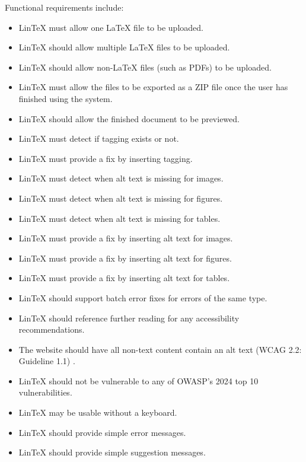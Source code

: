 \documentclass[11pt,titlepage,dvipsnames,table,xcdraw]{article}
\begin{document}
Functional requirements include:
\begin{itemize}
\item LinTeX must allow one LaTeX file to be uploaded.
\item LinTeX should allow multiple LaTeX files to be uploaded.
\item LinTeX should allow non-LaTeX files (such as PDFs) to be uploaded.
\item LinTeX must allow the files to be exported as a ZIP file once the user has finished using the system.
\item LinTeX should allow the finished document to be previewed.
\item LinTeX must detect if tagging exists or not.
\item LinTeX must provide a fix by inserting tagging.
\item LinTeX must detect when alt text is missing for images.
\item LinTeX must detect when alt text is missing for figures.
\item LinTeX must detect when alt text is missing for tables.
\item LinTeX must provide a fix by inserting alt text for images.
\item LinTeX must provide a fix by inserting alt text for figures.
\item LinTeX must provide a fix by inserting alt text for tables.
\item LinTeX should support batch error fixes for errors of the same type.
\item LinTeX should reference further reading for any accessibility recommendations.
\item The website should have all non-text content contain an alt text (WCAG 2.2: Guideline 1.1) \cite{wcag}.
\item LinTeX should not be vulnerable to any of OWASP's 2024 top 10 vulnerabilities.
\item LinTeX may be usable without a keyboard.
\item LinTeX should provide simple error messages.
\item LinTeX should provide simple suggestion messages.
\end{itemize}
\end{document}
